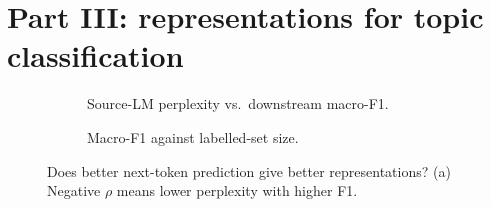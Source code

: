 \documentclass[10pt,a4paper]{article}
\begin{document}
\section{Part III: representations for topic classification}
\begin{table}[t]\centering\footnotesize
{}
\caption{AG News test accuracy and macro-F1 (\%) per frozen representation (300-d; TF-IDF 98,555-d) for 20,000 / 2,000 / 500 labels; $C$ chosen on 2,000 validation documents; LM features from seed-0 checkpoints; CI: 95\% bootstrap over the test set.}
\label{tab:p3}
\end{table}
\begin{figure}[t]\centering
\begin{subfigure}[t]{0.49\linewidth}\centering{}\caption{Source-LM perplexity vs.\ downstream macro-F1.}\end{subfigure}\hfill
\begin{subfigure}[t]{0.49\linewidth}\centering{}\caption{Macro-F1 against labelled-set size.}\end{subfigure}
\caption{Does better next-token prediction give better representations? (a) Negative $\rho$ means lower perplexity with higher F1.}
\label{fig:p3}
\end{figure}
\begin{table}[t]\centering\scriptsize
\begin{minipage}[t]{0.38\linewidth}\centering\vspace{0pt}\end{minipage}\hfill
\begin{minipage}[t]{0.60\linewidth}\centering\vspace{0pt}\end{minipage}
\caption{Confusion matrix (left) and the most confident error of each distinct true/predicted pair (right) of the best LM-based representation
(\confusionRep).}
\label{tab:p3err}
\end{table}
\end{document}
